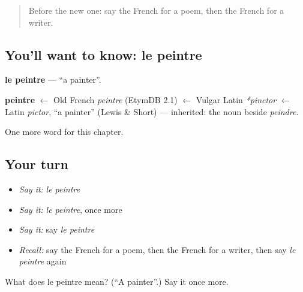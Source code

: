 \begin{quote}
Before the new one: say the French for a poem, then the French for a writer.
\end{quote}

\subsection*{You'll want to know: le peintre}
\textbf{le peintre} — \textquotedblleft{}a painter\textquotedblright{}.

\begin{cousinweb}
\textbf{peintre} $\leftarrow$ Old French \emph{peintre} (EtymDB 2.1) $\leftarrow$ Vulgar Latin \emph{*pinctor} $\leftarrow$ Latin \emph{pictor}, \textquotedblleft{}a painter\textquotedblright{} (Lewis \& Short) — inherited: the noun beside \emph{peindre}.
\end{cousinweb}

\begin{grammarlens}[title={What you've built}]
One more word for this chapter.
\end{grammarlens}

\subsection*{Your turn}
\begin{itemize}
\raggedright
  \item \emph{Say it:} \emph{le peintre}
  \item \emph{Say it:} \emph{le peintre}, once more
  \item \emph{Say it:} say \emph{le peintre}
  \item \emph{Recall:} say the French for a poem, then the French for a writer, then say \emph{le peintre} again
\end{itemize}

\begin{tcolorbox}[breakable,colback=teal!4,colframe=teal!35!black,title={Before you move on}]
What does le peintre mean? (\textquotedblleft{}A painter\textquotedblright{}.) Say it once more.
\end{tcolorbox}
